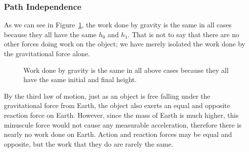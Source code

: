 \subsubsection{Path Independence}
As we can see in Figure~\ref{path-independence}, the work done by gravity is the
same in all cases because they all have the same $h_0$ and $h_1$. That is not
to say that there are no other forces doing work on the object; we have merely
isolated the work done by the gravitational force alone.
\begin{figure}[ht]
  \centering
  \caption{Work done by gravity is the same in all above cases because
    they all have the same initial and final height.}
  \label{path-independence}
\end{figure}


\begin{remark}
  By the third law of motion, just as an object is free falling under the
  gravitational force from Earth, the object also exerts an equal and opposite
  reaction force on Earth. However, since the mass of Earth is much higher,
  this minuscule force would not cause any measurable acceleration, therefore
  there is nearly no work done on Earth. Action and reaction forces may be
  equal and opposite, but the work that they do are rarely the same.
\end{remark}



